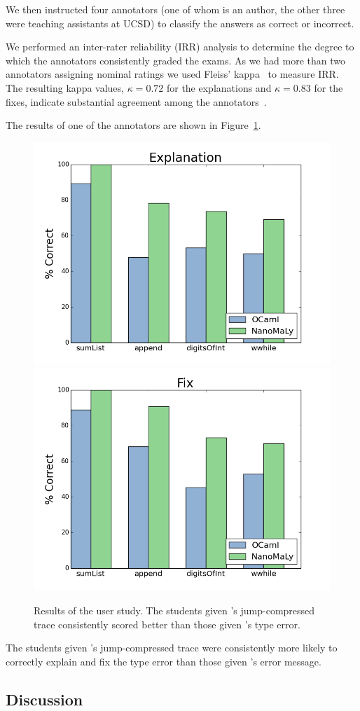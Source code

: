 We then instructed four annotators (one of whom is an author, the other
three were teaching assistants at UCSD) to classify the answers as
correct or incorrect.

We performed an inter-rater reliability (IRR) analysis to determine the
degree to which the annotators consistently graded the exams.
%
As we had more than two annotators assigning nominal ratings we used
Fleiss' kappa~\cite{XXX} to measure IRR.
%
The resulting kappa values, $\kappa = 0.72$ for the explanations and
$\kappa = 0.83$ for the fixes, indicate substantial agreement among
the annotators~\cite{XXX}.

The results of one of the annotators are shown in
Figure~\ref{fig:results-user-study}.
%
\begin{figure}[t]
\centering
\includegraphics[width=0.49\linewidth]{user-study-reason.png}
\includegraphics[width=0.49\linewidth]{user-study-fix.png}
\caption{Results of the user study. The students given \toolname's
  jump-compressed trace consistently scored better than those
  given \ocaml's type error.}
\label{fig:results-user-study}
\end{figure}
%
The students given \toolname's jump-compressed trace were consistently
more likely to correctly explain and fix the type error than those
given \ocaml's error message.

\subsection{Discussion}
\label{sec:discussion}

